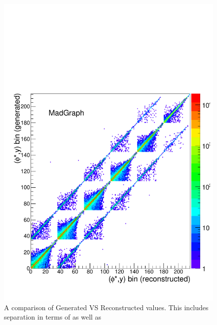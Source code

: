 \begin{figure}
    \centering
    \includegraphics[width=\linewidth]{figures/Simulation/GenRecoTwoDTwoDPlot.pdf}
    \caption[\rapidity and \phistar unfolding matrix]{A comparison of Generated VS Reconstructed values. This includes separation in terms of \phistar as well as \rapidity}
    \label{fig:2DBinMigration}
\end{figure}




